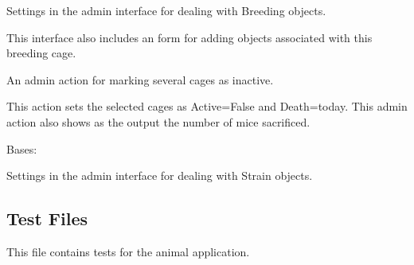\documentclass[letterpaper,10pt,english]{sphinxmanual}
\begin{document}
\begin{fulllineitems}
\begin{fulllineitems}
Settings in the admin interface for dealing with Breeding objects.

This interface also includes an form for adding objects associated with this breeding cage.

\begin{fulllineitems}
\label{api:animal.admin.BreedingAdmin.mark_deactivated}
An admin action for marking several cages as inactive.

This action sets the selected cages as Active=False and Death=today.
This admin action also shows as the output the number of mice sacrificed.

\end{fulllineitems}


\begin{fulllineitems}
\label{api:animal.admin.BreedingAdmin.media}
\end{fulllineitems}


\end{fulllineitems}


\begin{fulllineitems}
\label{api:animal.admin.StrainAdmin}
Bases: 

Settings in the admin interface for dealing with Strain objects.

\begin{fulllineitems}
\label{api:animal.admin.StrainAdmin.media}
\end{fulllineitems}


\end{fulllineitems}



\subsection{Test Files}
\label{api:id5}\label{api:module-animal.tests}
This file contains tests for the animal application.


\end{fulllineitems}
\end{document}
